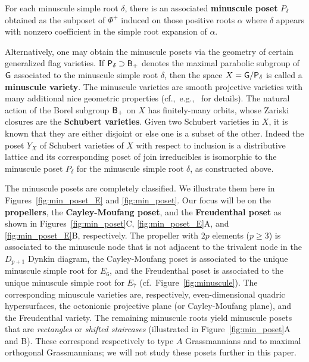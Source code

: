 \documentclass[12pt]{amsart}
\theoremstyle{definition}
\theoremstyle{remark}
\numberwithin{equation}{section}
\begin{document}
For each minuscule simple root $\delta$, there is an associated {\bf minuscule poset} $P_\delta$ obtained as the subposet of $\Phi^+$ induced on those positive roots $\alpha$ where $\delta$ appears with nonzero coefficient in the simple root expansion of $\alpha$. 

Alternatively, one may obtain the minuscule posets via the geometry of certain generalized flag varieties. If ${\sf P}_\delta \supset {\sf B_+}$ denotes the maximal parabolic subgroup of ${\sf G}$ associated to the minuscule simple root $\delta$, then the space $X = {\sf G} / {\sf P}_\delta$ is called a {\bf minuscule variety}. The minuscule varieties are smooth projective varieties with many additional nice geometric properties (cf.,~e.g.,~\cite{Billey.Lakshmibai} for details). The natural action of the Borel subgroup ${\sf B}_+$ on $X$ has finitely-many orbits, whose Zariski closures are the {\bf Schubert varieties}. Given two Schubert varieties in $X$, it is known that they are either disjoint or else one is a subset of the other. Indeed the poset $Y_X$ of Schubert varieties of $X$ with respect to inclusion is a distributive lattice and its corresponding poset of join irreducibles is isomorphic to the minuscule poset $P_\delta$ for the minuscule simple root $\delta$, as constructed above.

The minuscule posets are completely classified. We illustrate them here in Figures~\ref{fig:min_poset_E} and \ref{fig:min_poset}. Our focus will be on the {\bf propellers}, the {\bf Cayley-Moufang poset}, and the {\bf Freudenthal poset} as shown in Figures~\ref{fig:min_poset}C, \ref{fig:min_poset_E}A, and \ref{fig:min_poset_E}B, respectively. The propeller with $2p$ elements ($p \geq 3$) is associated to the minuscule node that is not adjacent to the trivalent node in the $D_{p+1}$ Dynkin diagram, the Cayley-Moufang poset is associated to the unique minuscule simple root for $E_6$, and the Freudenthal poset is associated to the unique minuscule simple root for $E_7$ (cf.\ Figure~\ref{fig:minuscule}). The corresponding minuscule varieties are, respectively, even-dimensional quadric hypersurfaces, the octonionic projective plane (or Cayley-Moufang plane), and the Freudenthal variety. The remaining minuscule roots yield minuscule posets that are \emph{rectangles} or \emph{shifted staircases} (illustrated in Figure~\ref{fig:min_poset}A and B). These correspond respectively to type $A$ Grassmannians and to maximal orthogonal Grassmannians; we will not study these posets further in this paper.
\end{document}
